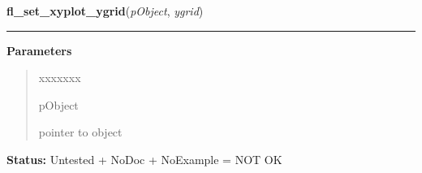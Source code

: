 \hspace{.8\funcindent}\begin{boxedminipage}{\funcwidth}

    \raggedright \textbf{fl\_set\_xyplot\_ygrid}(\textit{pObject}, \textit{ygrid})

    \vspace{-1.5ex}

    \rule{\textwidth}{0.5\fboxrule}
\setlength{\parskip}{2ex}
\setlength{\parskip}{1ex}
      \textbf{Parameters}
      \vspace{-1ex}

      \begin{quote}
        \begin{Ventry}{xxxxxxx}

          \item[pObject]

          pointer to object

        \end{Ventry}

      \end{quote}

\textbf{Status:} Untested + NoDoc + NoExample = NOT OK



    \end{boxedminipage}

    \label{xformslib:library:fl_set_xyplot_grid_linestyle}

    \vspace{0.5ex}


